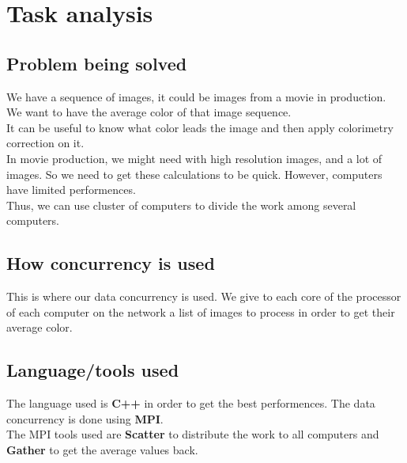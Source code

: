 \section{Task analysis}

\subsection{Problem being solved}
We have a sequence of images, it could be images from a movie in production. We want to have the average color of that image sequence.\\
It can be useful to know what color leads the image and then apply colorimetry correction on it.\\
In movie production, we might need with high resolution images, and a lot of images. So we need to get these calculations to be quick. However, computers have limited performences.\\
Thus, we can use cluster of computers to divide the work among several computers.\\
\subsection{How concurrency is used}
This is where our data concurrency is used. We give to each core of the processor of each computer on the network a list of images to process in order to get their average color.\\
\subsection{Language/tools used}
The language used is \textbf{C++} in order to get the best performences. The data concurrency is done using \textbf{MPI}.\\
The MPI tools used are \textbf{Scatter} to distribute the work to all computers and \textbf{Gather} to get the average values back.